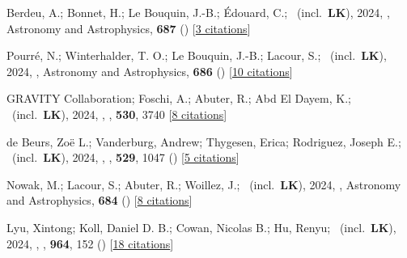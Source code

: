\item[{\color{numcolor}\scriptsize109}] Berdeu, A.; Bonnet, H.; Le Bouquin, J.-B.; {\'E}douard, C.; \etal\ (incl.\ \textbf{LK}), 2024, , Astronomy and Astrophysics, \textbf{687} () [\href{https://ui.adsabs.harvard.edu/abs/2024A&A...687A.157B}{3 citations}]

\item[{\color{numcolor}\scriptsize108}] Pourr{\'e}, N.; Winterhalder, T. O.; Le Bouquin, J.-B.; Lacour, S.; \etal\ (incl.\ \textbf{LK}), 2024, , Astronomy and Astrophysics, \textbf{686} () [\href{https://ui.adsabs.harvard.edu/abs/2024A&A...686A.258P}{10 citations}]

\item[{\color{numcolor}\scriptsize107}] GRAVITY Collaboration; Foschi, A.; Abuter, R.; Abd El Dayem, K.; \etal\ (incl.\ \textbf{LK}), 2024, , \mnras, \textbf{530}, 3740 [\href{https://ui.adsabs.harvard.edu/abs/2024MNRAS.530.3740G}{8 citations}]

\item[{\color{numcolor}\scriptsize106}] de Beurs, Zo{\"e} L.; Vanderburg, Andrew; Thygesen, Erica; Rodriguez, Joseph E.; \etal\ (incl.\ \textbf{LK}), 2024, , \mnras, \textbf{529}, 1047 () [\href{https://ui.adsabs.harvard.edu/abs/2024MNRAS.529.1047D}{5 citations}]

\item[{\color{numcolor}\scriptsize105}] Nowak, M.; Lacour, S.; Abuter, R.; Woillez, J.; \etal\ (incl.\ \textbf{LK}), 2024, , Astronomy and Astrophysics, \textbf{684} () [\href{https://ui.adsabs.harvard.edu/abs/2024A&A...684A.184N}{8 citations}]

\item[{\color{numcolor}\scriptsize104}] Lyu, Xintong; Koll, Daniel D. B.; Cowan, Nicolas B.; Hu, Renyu; \etal\ (incl.\ \textbf{LK}), 2024, , \apj, \textbf{964}, 152 () [\href{https://ui.adsabs.harvard.edu/abs/2024ApJ...964..152L}{18 citations}]

